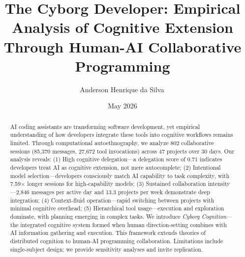 \documentclass{ntlabs-preprint}
\title{The Cyborg Developer: Empirical Analysis of Cognitive Extension Through Human-AI Collaborative Programming}
\author[1,2]{Anderson Henrique da Silva\,\orcidlink{0009-0001-7144-4974}}
\affil[1]{\href{https://ntlabs.dev}{NTLabs.dev}}
\affil[2]{IFSULDEMINAS, Minas Gerais, Brasil}
\affil[ ]{\href{mailto:anderson@ntlabs.dev}{anderson@ntlabs.dev}}
\date{May 2026}
\begin{document}
\maketitle

\begin{abstract}
AI coding assistants are transforming software development, yet empirical understanding of how developers integrate these tools into cognitive workflows remains limited. Through computational autoethnography, we analyze 802 collaborative sessions (85,370 messages, 27,672 tool invocations) across 47 projects over 30 days. Our analysis reveals: (1) High cognitive delegation---a delegation score of 0.71 indicates developers treat AI as cognitive extension, not mere autocomplete; (2) Intentional model selection---developers consciously match AI capability to task complexity, with 7.59$\times$ longer sessions for high-capability models; (3) Sustained collaboration intensity---2,846 messages per active day and 13.3 projects per week demonstrate deep integration; (4) Context-fluid operation---rapid switching between projects with minimal cognitive overhead; (5) Hierarchical tool usage---execution and exploration dominate, with planning emerging in complex tasks. We introduce \textit{Cyborg Cognition}---the integrated cognitive system formed when human direction-setting combines with AI information gathering and execution. This framework extends theories of distributed cognition to human-AI programming collaboration. Limitations include single-subject design; we provide sensitivity analyses and invite replication.
\end{abstract}













\appendix

\end{document}
